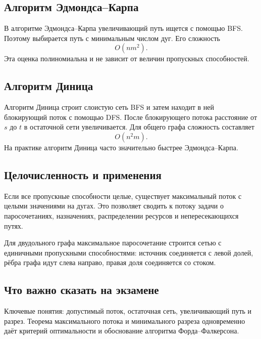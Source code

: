 \subsection{Алгоритм Эдмондса--Карпа}

В алгоритме Эдмондса--Карпа увеличивающий путь ищется с помощью BFS.
Поэтому выбирается путь с минимальным числом дуг. Его сложность
\[
    O(nm^2).
\]
Эта оценка полиномиальна и не зависит от величин пропускных способностей.

\subsection{Алгоритм Диница}

Алгоритм Диница строит слоистую сеть BFS и затем находит в ней блокирующий поток
с помощью DFS. После блокирующего потока расстояние от $s$ до $t$ в остаточной
сети увеличивается. Для общего графа сложность составляет
\[
    O(n^2m).
\]
На практике алгоритм Диница часто значительно быстрее Эдмондса--Карпа.

\subsection{Целочисленность и применения}

Если все пропускные способности целые, существует максимальный поток с целыми
значениями на дугах. Это позволяет сводить к потоку задачи о паросочетаниях,
назначениях, распределении ресурсов и непересекающихся путях.

Для двудольного графа максимальное паросочетание строится сетью с единичными
пропускными способностями: источник соединяется с левой долей, рёбра графа идут
слева направо, правая доля соединяется со стоком.

\subsection{Что важно сказать на экзамене}

Ключевые понятия: допустимый поток, остаточная сеть, увеличивающий путь и разрез.
Теорема максимального потока и минимального разреза одновременно даёт критерий
оптимальности и обоснование алгоритма Форда--Фалкерсона.

\newpage